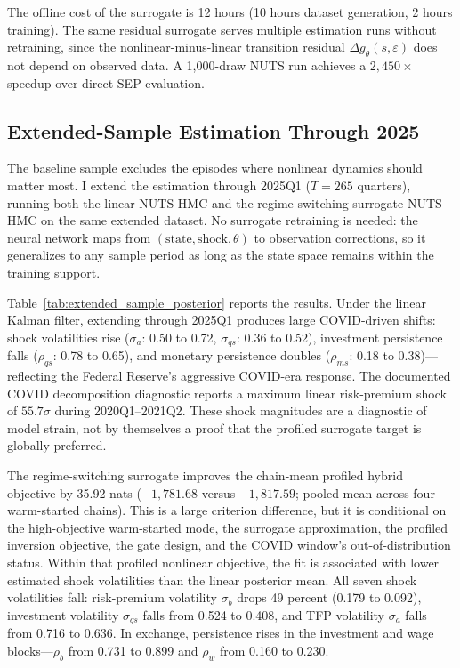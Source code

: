 \documentclass[12pt]{article}
\theoremstyle{plain}
\theoremstyle{definition}
\theoremstyle{remark}
\begin{document}
The offline cost of the surrogate is 12 hours (10 hours dataset generation, 2 hours training). The same residual surrogate serves multiple estimation runs without retraining, since the nonlinear-minus-linear transition residual $\Delta g_\theta(s, \varepsilon)$ does not depend on observed data. A 1,000-draw NUTS run achieves a $2{,}450\times$ speedup over direct SEP evaluation.


\subsection{Extended-Sample Estimation Through 2025}
\label{subsec:extended_sample}

The baseline sample excludes the episodes where nonlinear dynamics should matter most. I extend the estimation through 2025Q1 ($T = 265$ quarters), running both the linear NUTS-HMC and the regime-switching surrogate NUTS-HMC on the same extended dataset. No surrogate retraining is needed: the neural network maps from $(\text{state}, \text{shock}, \theta)$ to observation corrections, so it generalizes to any sample period as long as the state space remains within the training support.

Table~\ref{tab:extended_sample_posterior} reports the results. Under the linear Kalman filter, extending through 2025Q1 produces large COVID-driven shifts: shock volatilities rise ($\sigma_a$: 0.50 to 0.72, $\sigma_{qs}$: 0.36 to 0.52), investment persistence falls ($\rho_{qs}$: 0.78 to 0.65), and monetary persistence doubles ($\rho_{ms}$: 0.18 to 0.38)---reflecting the Federal Reserve's aggressive COVID-era response. The documented COVID decomposition diagnostic reports a maximum linear risk-premium shock of $55.7\sigma$ during 2020Q1--2021Q2. These shock magnitudes are a diagnostic of model strain, not by themselves a proof that the profiled surrogate target is globally preferred.

The regime-switching surrogate improves the chain-mean profiled hybrid objective by 35.92 nats ($-1{,}781.68$ versus $-1{,}817.59$; pooled mean across four warm-started chains). This is a large criterion difference, but it is conditional on the high-objective warm-started mode, the surrogate approximation, the profiled inversion objective, the gate design, and the COVID window's out-of-distribution status. Within that profiled nonlinear objective, the fit is associated with lower estimated shock volatilities than the linear posterior mean. All seven shock volatilities fall: risk-premium volatility $\sigma_b$ drops 49 percent (0.179 to 0.092), investment volatility $\sigma_{qs}$ falls from 0.524 to 0.408, and TFP volatility $\sigma_a$ falls from 0.716 to 0.636. In exchange, persistence rises in the investment and wage blocks---$\rho_b$ from 0.731 to 0.899 and $\rho_w$ from 0.160 to 0.230.
\end{document}
